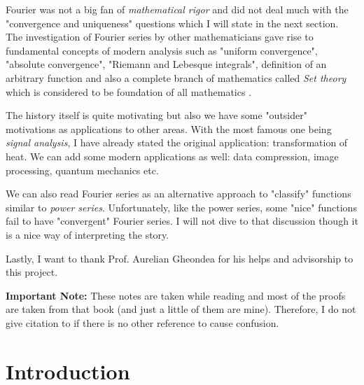 \documentclass[12pt]{amsart}
\theoremstyle{definition}
\begin{document}
Fourier was not a big fan of \emph{mathematical rigor} and did not deal much with the "convergence and uniqueness" questions which I will state in the next section. The investigation of Fourier series by other mathematicians gave rise to fundamental concepts of modern analysis such as "uniform convergence", "absolute convergence", "Riemann and Lebesque integrals", definition of an arbitrary function and also a complete branch of mathematics called \emph{Set theory} which is considered to be foundation of all mathematics \cite{History}.



The history itself is quite motivating but also we have some "outsider" motivations as applications to other areas. With the most famous one being \emph{signal analysis}, I have already stated the original application: transformation of heat. We can add some modern applications as well: data compression, image processing, quantum mechanics etc.


We can also read Fourier series as an alternative approach to "classify" functions similar to \emph{power series}. Unfortunately, like the power series, some "nice" functions fail to have "convergent" Fourier series. I will not dive to that discussion though it is a nice way of interpreting the story.

Lastly, I want to thank Prof. Aurelian Gheondea for his helps and advisorship to this project.

\textbf{Important Note:} These notes are taken while reading \cite{Wade} and most of the proofs are taken from that book (and just a little of them are mine). Therefore, I do not give citation to \cite{Wade} if there is no other reference to cause confusion.

\section{Introduction}
\end{document}
